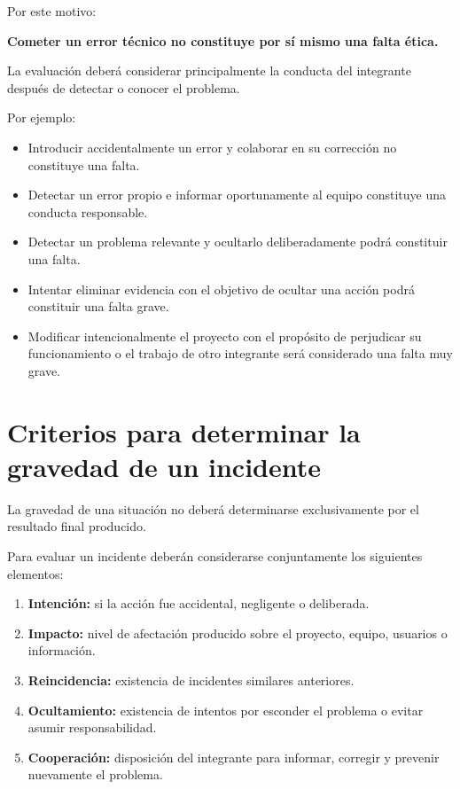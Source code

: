\documentclass[12pt,a4paper]{article}
\begin{document}
Por este motivo:

\begin{center}
    \textbf{Cometer un error técnico no constituye por sí mismo una falta ética.}
\end{center}

La evaluación deberá considerar principalmente la conducta del integrante después de detectar o conocer el problema.

Por ejemplo:

\begin{itemize}
    \item Introducir accidentalmente un error y colaborar en su corrección no constituye una falta.

    \item Detectar un error propio e informar oportunamente al equipo constituye una conducta responsable.

    \item Detectar un problema relevante y ocultarlo deliberadamente podrá constituir una falta.

    \item Intentar eliminar evidencia con el objetivo de ocultar una acción podrá constituir una falta grave.

    \item Modificar intencionalmente el proyecto con el propósito de perjudicar su funcionamiento o el trabajo de otro integrante será considerado una falta muy grave.
\end{itemize}

\section{Criterios para determinar la gravedad de un incidente}

La gravedad de una situación no deberá determinarse exclusivamente por el resultado final producido.

Para evaluar un incidente deberán considerarse conjuntamente los siguientes elementos:

\begin{enumerate}
    \item \textbf{Intención:} si la acción fue accidental, negligente o deliberada.

    \item \textbf{Impacto:} nivel de afectación producido sobre el proyecto, equipo, usuarios o información.

    \item \textbf{Reincidencia:} existencia de incidentes similares anteriores.

    \item \textbf{Ocultamiento:} existencia de intentos por esconder el problema o evitar asumir responsabilidad.

    \item \textbf{Cooperación:} disposición del integrante para informar, corregir y prevenir nuevamente el problema.
\end{enumerate}
\end{document}
